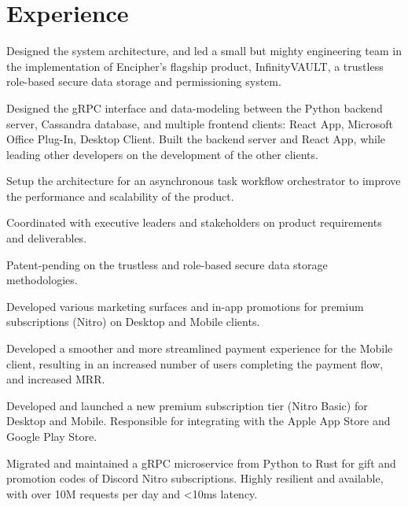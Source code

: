 \documentclass[letterpaper]{deedy-resume-openfont} %
\begin{document}
\begin{minipage}[t]{0.73\textwidth} %


\section{Experience}
\sectionheadersep

\sectionsep

\begin{tightemize}
\item Designed the system architecture, and led a small but mighty engineering team in the implementation of Encipher's flagship product, InfinityVAULT, a trustless role-based secure data storage and permissioning system.
\item Designed the gRPC interface and data-modeling between the Python backend server, Cassandra database, and multiple frontend clients: React App, Microsoft Office Plug-In, Desktop Client. Built the backend server and React App, while leading other developers on the development of the other clients.
\item Setup the architecture for an asynchronous task workflow orchestrator to improve the performance and scalability of the product.
\item Coordinated with executive leaders and stakeholders on product requirements and deliverables.
\item Patent-pending on the trustless and role-based secure data storage methodologies.
\end{tightemize}

\sectionsep %


\begin{tightemize}
\item Developed various marketing surfaces and in-app promotions for premium subscriptions (Nitro) on Desktop and Mobile clients.
\item Developed a smoother and more streamlined payment experience for the Mobile client, resulting in an increased number of users completing the payment flow, and increased MRR.
\item Developed and launched a new premium subscription tier (Nitro Basic) for Desktop and Mobile. Responsible for integrating with the Apple App Store and Google Play Store. 
\item Migrated and maintained a gRPC microservice from Python to Rust for gift and promotion codes of Discord Nitro subscriptions. Highly resilient and available, with over 10M requests per day and <10ms latency.
\end{tightemize}


\end{minipage}
\end{document}
